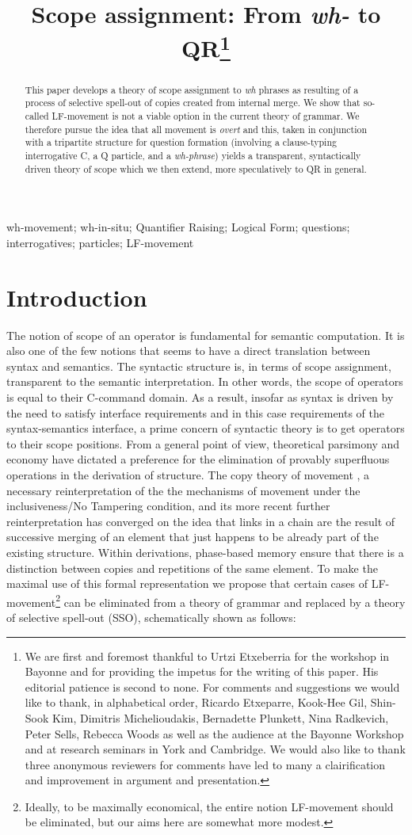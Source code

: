\documentclass[charis]{glossa}
\title[Scope assignment]{Scope assignment: From \textit{wh-} to QR\thanks{We are first and foremost thankful to Urtzi Etxeberria for the workshop in Bayonne and for providing the impetus for the writing of this paper.  His editorial patience is second to none. For comments and suggestions we would like to thank, in alphabetical order, Ricardo Etxeparre, Kook-Hee Gil, Shin-Sook Kim, Dimitris Michelioudakis, Bernadette Plunkett, Nina Radkevich, Peter Sells, Rebecca Woods as well as the audience at the Bayonne Workshop and at research seminars in York and Cambridge.  We would also like to thank three anonymous reviewers for comments have led to many a clairification and  improvement in argument and presentation. }}
\author[Tsoulas \& Yeo]%
{%
  \spauthor{George Tsoulas\\
  \institute{University of York}\\
  \small{Heslington, York YO10 5DD, UK\\
  george.tsoulas@york.ac.uk}
  }
  \AND
  \spauthor{Norman Yeo\\
  \institute{University of York}\\
  \small{Heslington, York YO10 5DD, UK\\
  norman.yeo@york.ac.uk}
  }%
}
\begin{document}
\sffamily
\maketitle

\begin{abstract}
This paper develops a theory of scope assignment to \textit{wh} phrases as resulting of a process of selective spell-out of copies created from internal merge.  We show that so-called LF-movement is not a viable option in the current theory of grammar.  We therefore pursue the idea that all movement is \textit{overt} and this, taken in conjunction with a tripartite structure for question formation (involving a clause-typing interrogative C, a Q particle, and a \textit{wh-phrase}) yields a transparent, syntactically driven theory of scope which we then extend, more speculatively to QR in general. 
\end{abstract}

\begin{keywords}

  wh-movement; wh-in-situ; Quantifier Raising; Logical Form; questions; interrogatives; particles; LF-movement

\end{keywords}


\rmfamily
\section{Introduction}
The notion of scope of an operator is fundamental for semantic computation. It is also one of the few notions that seems to have a direct translation between syntax and semantics. The syntactic structure is, in terms of scope assignment, transparent to the semantic interpretation.  In other words, the scope of operators is equal to their C-command domain.  As a result, insofar as syntax is driven by the need to satisfy interface requirements and in this case requirements of the syntax-semantics interface, a prime concern of syntactic theory is to get operators to their scope positions. From a general point of view, theoretical parsimony and economy have dictated a preference for the elimination of provably superfluous operations in the derivation of structure. The copy theory of movement \citep{chomsky:1993}, a necessary reinterpretation of the the mechanisms of movement under the inclusiveness/No Tampering condition, and its more recent further reinterpretation has converged on the idea that links in a chain are the result of successive merging of an element that just happens to be already part of the existing structure. Within derivations, phase-based memory ensure that there is a distinction between copies and repetitions of the same element. To make the maximal use of this formal representation we propose that certain cases of LF-movement\footnote{Ideally, to be maximally economical, the entire notion LF-movement should be eliminated, but our aims here are somewhat more modest.} can be eliminated from a theory of grammar and replaced by a theory of selective spell-out (SSO), schematically shown as follows:
\end{document}
